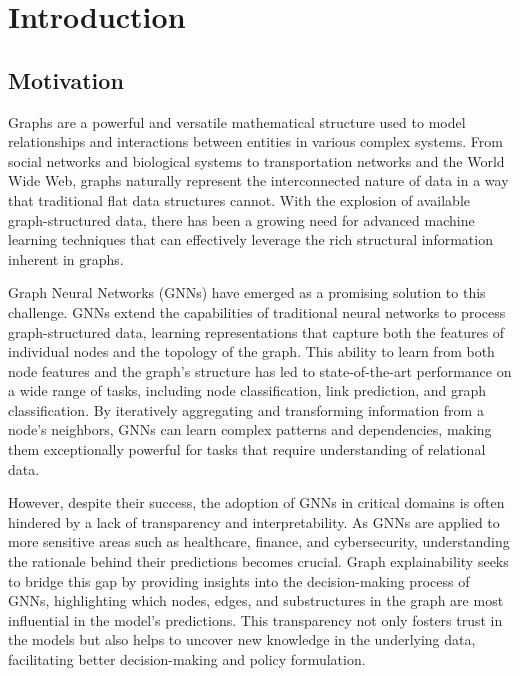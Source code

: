 \chapter{Introduction}

\section{Motivation}

Graphs are a powerful and versatile mathematical structure used to model relationships and interactions between entities in various complex systems. From social networks and biological systems to transportation networks and the World Wide Web, graphs naturally represent the interconnected nature of data in a way that traditional flat data structures cannot. With the explosion of available graph-structured data, there has been a growing need for advanced machine learning techniques that can effectively leverage the rich structural information inherent in graphs.

Graph Neural Networks (GNNs) have emerged as a promising solution to this challenge. GNNs extend the capabilities of traditional neural networks to process graph-structured data, learning representations that capture both the features of individual nodes and the topology of the graph. This ability to learn from both node features and the graph’s structure has led to state-of-the-art performance on a wide range of tasks, including node classification, link prediction, and graph classification. By iteratively aggregating and transforming information from a node’s neighbors, GNNs can learn complex patterns and dependencies, making them exceptionally powerful for tasks that require understanding of relational data.

However, despite their success, the adoption of GNNs in critical domains is often hindered by a lack of transparency and interpretability. As GNNs are applied to more sensitive areas such as healthcare, finance, and cybersecurity, understanding the rationale behind their predictions becomes crucial. Graph explainability seeks to bridge this gap by providing insights into the decision-making process of GNNs, highlighting which nodes, edges, and substructures in the graph are most influential in the model’s predictions. This transparency not only fosters trust in the models but also helps to uncover new knowledge in the underlying data, facilitating better decision-making and policy formulation.

